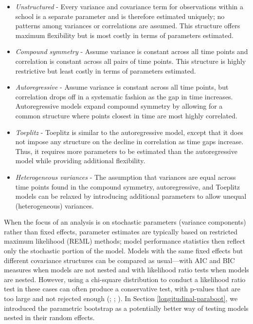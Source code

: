 \documentclass[
]{krantz}
\providecommand{\tightlist}{%
  \setlength{\itemsep}{0pt}\setlength{\parskip}{0pt}}
\begin{document}
\begin{itemize}
\tightlist
\item
  \emph{Unstructured} - Every variance and covariance term for observations within a school is a separate parameter and is therefore estimated uniquely; no patterns among variances or correlations are assumed. This structure offers maximum flexibility but is most costly in terms of parameters estimated.
\item
  \emph{Compound symmetry} - Assume variance is constant across all time points and correlation is constant across all pairs of time points. This structure is highly restrictive but least costly in terms of parameters estimated.
\item
  \emph{Autoregressive} - Assume variance is constant across all time points, but correlation drops off in a systematic fashion as the gap in time increases. Autoregressive models expand compound symmetry by allowing for a common structure where points closest in time are most highly correlated.
\item
  \emph{Toeplitz} - Toeplitz is similar to the autoregressive model, except that it does not impose any structure on the decline in correlation as time gaps increase. Thus, it requires more parameters to be estimated than the autoregressive model while providing additional flexibility.
\item
  \emph{Heterogeneous variances} - The assumption that variances are equal across time points found in the compound symmetry, autoregressive, and Toeplitz models can be relaxed by introducing additional parameters to allow unequal (heterogeneous) variances.
\end{itemize}

When the focus of an analysis is on stochastic parameters (variance components) rather than fixed effects, parameter estimates are typically based on restricted maximum likelihood (REML) methods; model performance statistics then reflect only the stochastic portion of the model. Models with the same fixed effects but different covariance structures can be compared as usual---with AIC and BIC measures when models are not nested and with likelihood ratio tests when models are nested. However, using a chi-square distribution to conduct a likelihood ratio test in these cases can often produce a conservative test, with p-values that are too large and not rejected enough (\citet{Bryk2002}; \citet{Singer2003}; \citet{Faraway2005}). In Section \ref{longitudinal-paraboot}, we introduced the parametric bootstrap as a potentially better way of testing models nested in their random effects.
\end{document}

